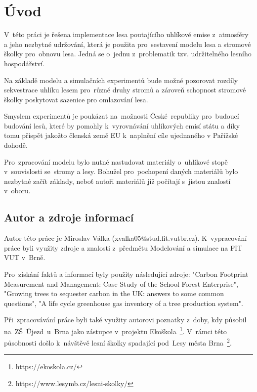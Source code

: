 \documentclass[a4paper, 11pt, titlepage]{article}
\begin{document}



\renewcommand{\contentsname}{Obsah}
\tableofcontents

\newpage
\section{Úvod} \label{sec:uvod}

V~této práci je řešena implementace lesa poutajícího uhlíkové emise z~atmosféry a jeho nezbytné udržování, která je použita pro~sestavení modelu\cite[snímek 7]{IMS_prez} lesa a stromové školky pro~obnovu lesa. 
Jedná se o~jednu z~problematik tzv. udržitelného lesního hospodářství.

Na základě modelu a simulačních experimentů\cite[snímek 10]{IMS_prez} bude možné pozorovat rozdíly sekvestrace uhlíku lesem pro~různé druhy stromů a zároveň schopnost stromové školky poskytovat sazenice pro omlazování lesa.

Smyslem experimentů je poukázat na~možnosti České~republiky pro~budoucí budování lesů, které by pomohly k~vyrovnávání uhlíkových emisí státu a díky tomu přispět jakožto členská země EU k~naplnění cíle ujednaného v Pařížské dohodě.\cite{EU_Paris_Agreement}

Pro~zpracování modelu bylo nutné nastudovat materiály o~uhlíkové stopě v~souvislosti se~stromy a lesy. Bohužel pro~pochopení daných materiálů bylo nezbytné začít základy, neboť autoři materiálů již počítají s~jistou znalostí v~oboru.

\subsection{Autor a zdroje informací}

Autor této práce je Miroslav Válka (xvalka05@stud.fit.vutbr.cz). K~vypracování práce byli využity zdroje a znalosti z~předmětu Modelování a simulace\cite[]{IMS_prez} na FIT VUT v~Brně. 

Pro~získání faktů a informací byly použity následující zdroje: "Carbon Footprint Measurement and Management: Case Study of the School Forest Enterprise"\cite{School_Forest_Enterprise}, "Growing trees to sequester carbon in the UK: answers to some common questions"\cite{Growing_Tree_in_UK}, "A life cycle greenhouse gas inventory of a tree production system"\cite{greenhouse}.

Při~zpracovávání práce byli také využity autorovi poznatky z~doby, kdy působil na~ZŠ~Újezd~u~Brna jako zástupce v~projektu Ekoškola~\footnote{https://ekoskola.cz/}. V~rámci této působnosti došlo k~návštěvě lesní školky spadající pod~Lesy města Brna~\footnote{https://www.lesymb.cz/lesni-skolky/}.
\end{document}
